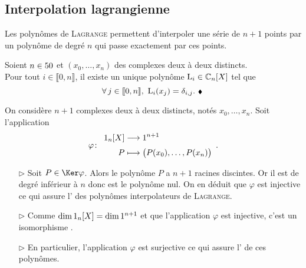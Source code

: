 \subsection{Interpolation lagrangienne}

Les polynômes de \textsc{Lagrange} permettent d'interpoler une série de $n+1$ points par un polynôme de degré $n$ qui passe exactement par ces points.

\begin{theo}
    Soient $n \in 50$ et $(x_0, \dots, x_n)$ des complexes deux à deux distincts. \\
    Pour tout $i \in \llbracket 0, n \rrbracket$, il existe un unique polynôme $\mathrm{L}_i \in \mathbb{C}_n[X]$ tel que 
    \begin{equation} \label{prop_fondamentale}
        \forall j \in \llbracket 0, n \rrbracket,\ \Lag_i(x_j) = \delta_{i,j}.\ \note
    \end{equation}
\end{theo}


\begin{demo}
    On considère $n + 1$ complexes deux à deux distincts, notés $x_0, \dots, x_n$. Soit l'application
    $$
    \fonction[\varphi]{\R_n[X]}{\R^{n+1}}{P}{\big(P(x_0), \dots, P(x_n) \big)}.
    $$
    \begin{itemize}
        \item[$\rhd$] Soit $P \in \Ker \varphi$. Alors le polynôme $P$ a $n+1$ racines discintes. Or il est de degré inférieur à $n$ donc est le polynôme nul. On en déduit que $\varphi$ est injective ce qui assure l' des polynômes interpolateurs de \textsc{Lagrange}.
        \item[$\rhd$] Comme $\dim 1_n[X] = \dim 1^{n+1}$ et que l'application $\varphi$ est injective, c'est un isomorphisme \note.
        \item[$\rhd$] En particulier, l'application $\varphi$ est surjective ce qui assure l' de ces polynômes. 
    \end{itemize}
\end{demo}

